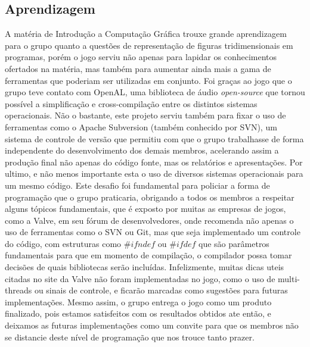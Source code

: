 

\subsection{Aprendizagem}\label{learning}

A matéria de Introdução a Computação Gráfica trouxe grande aprendizagem para o grupo quanto a questões de representação de figuras tridimensionais em programas, porém o jogo  serviu não apenas para lapidar os conhecimentos ofertados na matéria, mas também para aumentar ainda mais a gama de ferramentas que poderiam ser utilizadas em conjunto. Foi graças ao jogo que o grupo teve contato com OpenAL, uma biblioteca de áudio \textit{open-source} que tornou possível a simplificação e cross-compilação entre os distintos sistemas operacionais. Não o bastante, este projeto serviu também para fixar o uso de ferramentas como o Apache Subversion (também conhecido por SVN), um sistema de controle de versão que permitiu com que o grupo trabalhasse de forma independente do desenvolvimento dos demais membros, acelerando assim a produção final não apenas do código fonte, mas os relatórios e apresentações. Por ultimo, e não menos importante esta o uso de diversos sistemas operacionais para um mesmo código. Este desafio foi fundamental para policiar a forma de programação que o grupo praticaria, obrigando a todos os membros a respeitar alguns tópicos fundamentais, que é exposto por muitas as empresas de jogos, como a Valve, em seu fórum de desenvolvedores\cite{valve}, onde recomenda não apenas o uso de ferramentas como o SVN ou Git, mas que seja implementado um controle do código, com estruturas como $\#ifndef$ ou $\#ifdef$ que são parâmetros fundamentais para que em momento de compilação, o compilador possa tomar decisões de quais bibliotecas serão incluídas. Infelizmente, muitas dicas uteis citadas no site da Valve\cite{valve} não foram implementadas no jogo, como o  uso de multi-threads ou sinais de controle, e ficarão marcadas como sugestões para futuras implementações. Mesmo assim, o grupo entrega o jogo como um produto finalizado, pois estamos satisfeitos com os resultados obtidos ate então, e deixamos as futuras implementações como um convite para que os membros não se distancie deste nível de programação que nos trouce tanto prazer.

